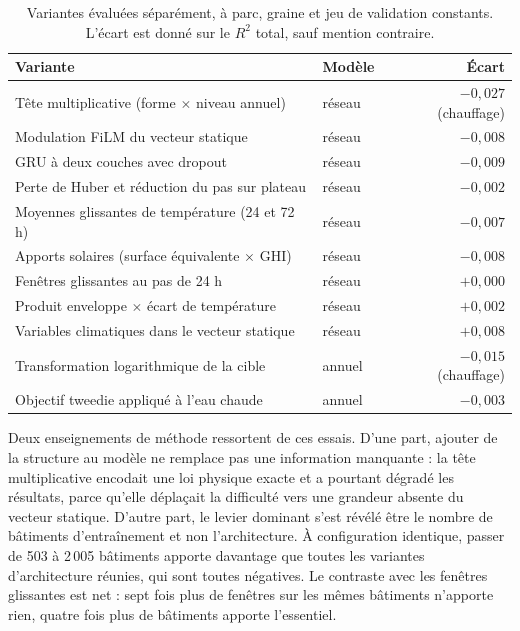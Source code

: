 \documentclass[11pt,a4paper]{article}
\begin{document}
\begin{table}[htbp]
  \centering
  \caption{Variantes évaluées séparément, à parc, graine et jeu de validation constants.
  L'écart est donné sur le $R^2$ total, sauf mention contraire.}
  \label{tab:ecartees}
  \begin{tabular}{llr}
    \toprule
    Variante & Modèle & Écart \\
    \midrule
    Tête multiplicative (forme $\times$ niveau annuel)    & réseau & $-0{,}027$ (chauffage) \\
    Modulation FiLM du vecteur statique                   & réseau & $-0{,}008$ \\
    GRU à deux couches avec dropout                       & réseau & $-0{,}009$ \\
    Perte de Huber et réduction du pas sur plateau        & réseau & $-0{,}002$ \\
    Moyennes glissantes de température (24 et 72 h)       & réseau & $-0{,}007$ \\
    Apports solaires (surface équivalente $\times$ GHI)   & réseau & $-0{,}008$ \\
    Fenêtres glissantes au pas de 24 h                    & réseau & $+0{,}000$ \\
    Produit enveloppe $\times$ écart de température       & réseau & $+0{,}002$ \\
    Variables climatiques dans le vecteur statique        & réseau & $+0{,}008$ \\
    Transformation logarithmique de la cible              & annuel & $-0{,}015$ (chauffage) \\
    Objectif tweedie appliqué à l'eau chaude              & annuel & $-0{,}003$ \\
    \bottomrule
  \end{tabular}
\end{table}

Deux enseignements de méthode ressortent de ces essais. D'une part, ajouter de la structure
au modèle ne remplace pas une information manquante : la tête multiplicative encodait une
loi physique exacte et a pourtant dégradé les résultats, parce qu'elle déplaçait la
difficulté vers une grandeur absente du vecteur statique. D'autre part, le levier dominant
s'est révélé être le nombre de bâtiments d'entraînement et non l'architecture. À
configuration identique, passer de 503 à 2\,005 bâtiments apporte davantage que toutes les
variantes d'architecture réunies, qui sont toutes négatives. Le contraste avec les fenêtres
glissantes est net : sept fois plus de fenêtres sur les mêmes bâtiments n'apporte rien,
quatre fois plus de bâtiments apporte l'essentiel.
\end{document}

